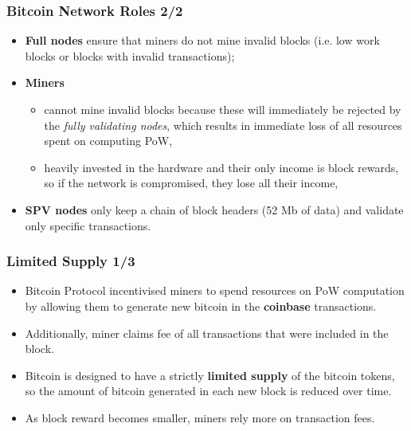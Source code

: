 \documentclass{beamer}
\begin{document}
\begin{frame}
  \frametitle{Bitcoin Network Roles 2/2}
  \begin{itemize}
  \item \textbf{Full nodes} ensure that miners do not mine invalid blocks
    (i.e. low work blocks or blocks with invalid transactions);
  \item \textbf{Miners}
    \begin{itemize}
    \item cannot mine invalid blocks because these will immediately be rejected
      by the \textit{fully validating nodes}, which results in immediate loss of
      all resources spent on computing PoW,
    \item heavily invested in the hardware and their only income is block
      rewards, so if the network is compromised, they lose all their income,
    \end{itemize}
  \item \textbf{SPV nodes} only keep a chain of block headers (52 Mb of data)
    and validate only specific transactions.
  \end{itemize}
\end{frame}

\begin{frame}
  \frametitle{Limited Supply 1/3}
  \begin{itemize}
  \item Bitcoin Protocol incentivised miners to spend resources on PoW
    computation by allowing them to generate new bitcoin in the
  \textbf{coinbase} transactions.
  \item Additionally, miner claims fee of all transactions that were included in
    the block.
  \item Bitcoin is designed to have a strictly \textbf{limited supply} of the
    bitcoin tokens, so the amount of bitcoin generated in each new block is
    reduced over time.
  \item As block reward becomes smaller, miners rely more on transaction fees.
  \end{itemize}
\end{frame}
\end{document}
